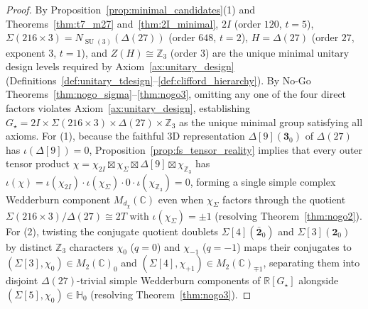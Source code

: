 \documentclass[11pt,a4paper]{article}
\theoremstyle{definition}
\theoremstyle{remark}
\newcommand{\R}{\mathbb{R}}
\newcommand{\C}{\mathbb{C}}
\newcommand{\quat}{\mathbb{H}}
\newcommand{\Z}{\mathbb{Z}}
\newcommand{\SU}{\operatorname{SU}}
\newcommand{\Gstar}{G_\star}
\begin{document}
\begin{proof}
By Proposition~\ref{prop:minimal_candidates}(1) and Theorems~\ref{thm:t7_m27} and~\ref{thm:2I_minimal}, $2I$ (order $120$, $t = 5$), $\Sigma(216 \times 3) = N_{\SU(3)}(\Delta(27))$ (order $648$, $t = 2$), $H = \Delta(27)$ (order $27$, exponent $3$, $t = 1$), and $Z(H) \cong \Z_3$ (order $3$) are the unique minimal unitary design levels required by Axiom~\ref{ax:unitary_design} (Definitions~\ref{def:unitary_tdesign}--\ref{def:clifford_hierarchy}). By No-Go Theorems~\ref{thm:nogo_sigma}--\ref{thm:nogo3}, omitting any one of the four direct factors violates Axiom~\ref{ax:unitary_design}, establishing $\Gstar = 2I \times \Sigma(216 \times 3) \times \Delta(27) \times \Z_3$ as the unique minimal group satisfying all axioms. For (1), because the faithful $3$D representation $\Delta[9](\mathbf{3}_0)$ of $\Delta(27)$ has $\iota(\Delta[9]) = 0$, Proposition~\ref{prop:fs_tensor_reality} implies that every outer tensor product $\chi = \chi_{2I} \boxtimes \chi_\Sigma \boxtimes \Delta[9] \boxtimes \chi_{\Z_3}$ has $\iota(\chi) = \iota(\chi_{2I}) \cdot \iota(\chi_\Sigma) \cdot 0 \cdot \iota(\chi_{\Z_3}) = 0$, forming a single simple complex Wedderburn component $M_{d_\chi}(\C)$ even when $\chi_\Sigma$ factors through the quotient $\Sigma(216 \times 3)/\Delta(27) \cong 2T$ with $\iota(\chi_\Sigma) = \pm 1$ (resolving Theorem~\ref{thm:nogo2}). For (2), twisting the conjugate quotient doublets $\Sigma[4](\bar{\mathbf{2}}_0)$ and $\Sigma[3](\mathbf{2}_0)$ by distinct $\Z_3$ characters $\chi_0$ ($q = 0$) and $\chi_{-1}$ ($q = -1$) maps their conjugates to $(\Sigma[3], \chi_0) \in M_2(\C)_0$ and $(\Sigma[4], \chi_{+1}) \in M_2(\C)_{\mp 1}$, separating them into disjoint $\Delta(27)$-trivial simple Wedderburn components of $\R[\Gstar]$ alongside $(\Sigma[5], \chi_0) \in \quat_0$ (resolving Theorem~\ref{thm:nogo3}).
\end{proof}
\end{document}
